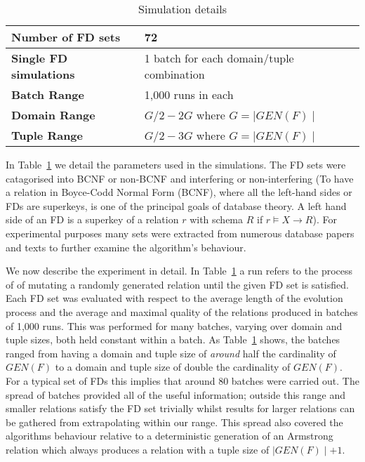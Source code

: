 \medskip

{\line
\begin{table}[ht]
\begin{center}
\begin{tabular}{|l||l|}
\hline
{\bf Number of FD sets}  & 72 \\ \hline
{\bf Single FD simulations} & 1 batch for each domain/tuple combination\\ \hline
{\bf Batch Range} & 1,000 runs in each \\ \hline
{\bf Domain Range} & $G/2 - 2G$ where $ G = \mid GEN(F) \mid$  \\ \hline
{\bf Tuple Range} & $G/2 - 3G$  where $ G = \mid GEN(F) \mid$  \\ \hline 
\end{tabular}
\end{center}
\caption{\label{table:5.01} Simulation details }
\end{table}
}

In Table~\ref{table:5.01} we detail the parameters used in the 
simulations.  The FD sets were catagorised into BCNF or non-BCNF
and interfering or non-interfering (To have a relation in Boyce-Codd
Normal Form (BCNF), where all the left-hand sides or FDs are superkeys,
is one of the principal goals of database theory. A left hand side of an FD 
is a superkey of a relation $r$ with schema $R$ if $r \models X \to R$).
For experimental purposes many sets
were extracted from numerous database papers and texts to further
examine the algorithm's behaviour.

\medskip

We now describe the experiment in detail. In Table~\ref{table:5.01} a
run refers to the process of  of mutating
a randomly generated relation until the given FD set is satisfied.
 Each FD set was evaluated with respect to the average length of the
 evolution process and the average and maximal quality of the relations
 produced in batches of 1,000 runs.
This was performed for many batches, varying over domain and tuple
sizes, both held constant within a batch. As Table~\ref{table:5.01} 
shows, the batches ranged from having a domain and tuple size
of {\em around} half the cardinality of $GEN(F)$ to
a domain and tuple size of double the cardinality of $GEN(F)$.
  For a typical set of FDs this implies that around 80 batches
 were carried out. The spread of batches provided all of the useful
information; outside this range and smaller relations satisfy the
FD set trivially whilst results for larger relations can be gathered
from extrapolating within our range. This spread also covered the
algorithms behaviour relative to a deterministic generation
of an Armstrong relation which always produces a relation with
a tuple size of $\mid GEN(F) \mid + 1$.

